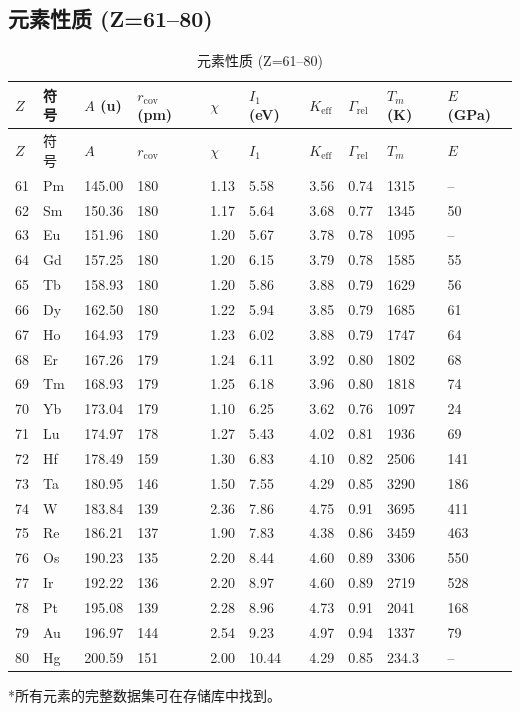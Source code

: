 \documentclass[12pt,a4paper]{article}
\newcommand{\Keff}{K_{\mathrm{eff}}}
\begin{document}
	\subsection*{元素性质 (Z=61–80)}
	
	\begin{longtable}{p{0.6cm}p{1.2cm}p{1.2cm}p{1.2cm}p{1.2cm}p{1.2cm}p{1.5cm}p{1.2cm}p{1.2cm}p{1.2cm}}
		\caption{元素性质 (Z=61–80)} \label{tab:elem-data-61to80} \\
		\toprule
		\(Z\) & 符号 & \(A\) (u) & \(r_{\text{cov}}\) (pm) & \(\chi\) & \(I_1\) (eV) & \(\Keff\) & \(\Gamma_{\text{rel}}\) & \(T_m\) (K) & \(E\) (GPa) \\
		\midrule
		\endfirsthead
		\toprule
		\(Z\) & 符号 & \(A\) & \(r_{\text{cov}}\) & \(\chi\) & \(I_1\) & \(\Keff\) & \(\Gamma_{\text{rel}}\) & \(T_m\) & \(E\) \\
		\midrule
		\endhead
		61 & Pm & 145.00 & 180 & 1.13 & 5.58 & 3.56 & 0.74 & 1315 & – \\
		62 & Sm & 150.36 & 180 & 1.17 & 5.64 & 3.68 & 0.77 & 1345 & 50 \\
		63 & Eu & 151.96 & 180 & 1.20 & 5.67 & 3.78 & 0.78 & 1095 & – \\
		64 & Gd & 157.25 & 180 & 1.20 & 6.15 & 3.79 & 0.78 & 1585 & 55 \\
		65 & Tb & 158.93 & 180 & 1.20 & 5.86 & 3.88 & 0.79 & 1629 & 56 \\
		66 & Dy & 162.50 & 180 & 1.22 & 5.94 & 3.85 & 0.79 & 1685 & 61 \\
		67 & Ho & 164.93 & 179 & 1.23 & 6.02 & 3.88 & 0.79 & 1747 & 64 \\
		68 & Er & 167.26 & 179 & 1.24 & 6.11 & 3.92 & 0.80 & 1802 & 68 \\
		69 & Tm & 168.93 & 179 & 1.25 & 6.18 & 3.96 & 0.80 & 1818 & 74 \\
		70 & Yb & 173.04 & 179 & 1.10 & 6.25 & 3.62 & 0.76 & 1097 & 24 \\
		71 & Lu & 174.97 & 178 & 1.27 & 5.43 & 4.02 & 0.81 & 1936 & 69 \\
		72 & Hf & 178.49 & 159 & 1.30 & 6.83 & 4.10 & 0.82 & 2506 & 141 \\
		73 & Ta & 180.95 & 146 & 1.50 & 7.55 & 4.29 & 0.85 & 3290 & 186 \\
		74 & W  & 183.84 & 139 & 2.36 & 7.86 & 4.75 & 0.91 & 3695 & 411 \\
		75 & Re & 186.21 & 137 & 1.90 & 7.83 & 4.38 & 0.86 & 3459 & 463 \\
		76 & Os & 190.23 & 135 & 2.20 & 8.44 & 4.60 & 0.89 & 3306 & 550 \\
		77 & Ir & 192.22 & 136 & 2.20 & 8.97 & 4.60 & 0.89 & 2719 & 528 \\
		78 & Pt & 195.08 & 139 & 2.28 & 8.96 & 4.73 & 0.91 & 2041 & 168 \\
		79 & Au & 196.97 & 144 & 2.54 & 9.23 & 4.97 & 0.94 & 1337 & 79 \\
		80 & Hg & 200.59 & 151 & 2.00 & 10.44 & 4.29 & 0.85 & 234.3 & – \\
		\bottomrule
	\end{longtable}
	*所有元素的完整数据集可在存储库中找到。
	
\end{document}
